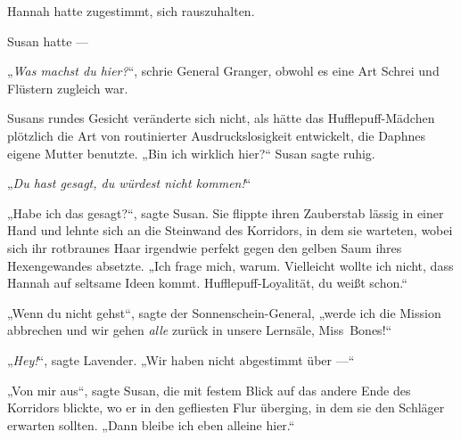 Hannah hatte zugestimmt, sich rauszuhalten.

Susan hatte —

\later

„\emph{Was machst du hier?}“, schrie General Granger, obwohl es eine Art Schrei und Flüstern zugleich war.

Susans rundes Gesicht veränderte sich nicht, als hätte das Hufflepuff-Mädchen plötzlich die Art von routinierter Ausdruckslosigkeit entwickelt, die Daphnes eigene Mutter benutzte.
„Bin ich wirklich hier?“ Susan sagte ruhig.

„\emph{Du hast gesagt, du würdest nicht kommen!}“

„Habe ich das gesagt?“, sagte Susan. Sie flippte ihren Zauberstab lässig in einer Hand und lehnte sich an die Steinwand des Korridors, in dem sie warteten, wobei sich ihr rotbraunes Haar irgendwie perfekt gegen den gelben Saum ihres Hexengewandes absetzte.
„Ich frage mich, warum. Vielleicht wollte ich nicht, dass Hannah auf seltsame Ideen kommt. Hufflepuff-Loyalität, du weißt schon.“

„Wenn du nicht gehst“, sagte der Sonnenschein-General, „werde ich die Mission abbrechen und wir gehen \emph{alle} zurück in unsere Lernsäle, Miss~Bones!“

„\emph{Hey!}“, sagte Lavender.
„Wir haben nicht abgestimmt über —“

„Von mir aus“, sagte Susan, die mit festem Blick auf das andere Ende des Korridors blickte, wo er in den gefliesten Flur überging, in dem sie den Schläger erwarten sollten.
„Dann bleibe ich eben alleine hier.“

